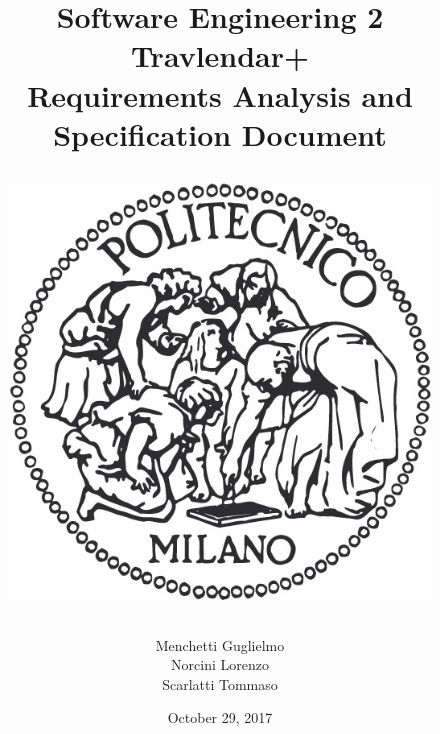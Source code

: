 \documentclass[12pt, a4paper]{article}
\begin{document}
\title{Software Engineering 2\\ \vspace{1em}  {\textbf{Travlendar+}} \\ \vspace{1em} \textbf{R}equirements \textbf{A}nalysis and \textbf{S}pecification \textbf{D}ocument
	\vspace{1.5em}
\begin{figure}[H]
	\centering
	\includegraphics[scale=0.4]{logo}
\end{figure}
}
\author{Menchetti Guglielmo\\ Norcini Lorenzo \\ Scarlatti Tommaso}

\date{October 29, 2017}

\maketitle

\tableofcontents
\newpage

\newpage

\newpage

\newpage

\newpage

%
\end{document}
